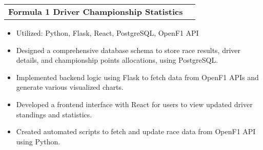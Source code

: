 \documentclass[letterpaper,11pt]{article}
\makeatletter
\newcommand{\resumeItem}[1]{
  \item\small{
    {#1 \vspace{-3pt}}
  }
}
\newcommand{\resumeProjectHeading}[2]{
    \item
    \begin{tabular*}{0.97\textwidth}{l@{\extracolsep{\fill}}r@{\hspace{-0.2in}}}
        \small#1 & #2 \\
    \end{tabular*}\vspace{-7pt}
}
\newcommand{\resumeItemListStart}{\begin{itemize}[leftmargin=0.15in, rightmargin=0.15in]}
\newcommand{\resumeItemListEnd}{\end{itemize}\vspace{-7pt}}
\makeatother
\begin{document}

        \resumeProjectHeading
            {\textbf{Formula 1 Driver Championship Statistics} {}}{}
            \resumeItemListStart
                \resumeItem{Utilized: Python, Flask, React, PostgreSQL, OpenF1 API}
                \resumeItem{Designed a comprehensive database schema to store race results, driver details, and championship points allocations, using PostgreSQL.}
                \resumeItem{Implemented backend logic using Flask to fetch data from OpenF1 APIs and generate various visualized charts.}
                \resumeItem{Developed a frontend interface with React for users to view updated driver standings and statistics.}            
                \resumeItem{Created automated scripts to fetch and update race data from OpenF1 API using Python.}            
            \resumeItemListEnd

\end{document}
